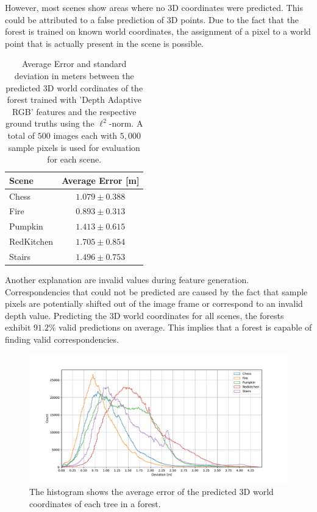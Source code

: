 \documentclass[final]{cvpr}
\begin{document}
However, most scenes show areas where no 3D coordinates
were predicted. This could be attributed to a false prediction of 3D points. Due to the fact that the forest is 
trained on known world coordinates, the assignment of a pixel to a world point that is actually present in the 
scene is possible. 

\begin{table}
	\begin{center}
	\begin{tabular}{|l|c|}
	\hline
	Scene & Average Error [m]\\
	\hline\hline
	Chess 		& 	$1.079 \pm 0.388$ \\
	Fire 		& 	$0.893 \pm 0.313$	\\
	Pumpkin 	& 	$1.413 \pm 0.615$ \\
	RedKitchen 	& 	$1.705 \pm 0.854$ \\
	Stairs 		& 	$1.496 \pm 0.753$ \\
	\hline
	\end{tabular}
	\end{center}
	\caption{Average Error and standard deviation in meters between the predicted 3D world cordinates of the 
	forest trained with 
	'Depth Adaptive RGB' features and the respective ground truths using the $\ell^2$-norm. A total of
	$500$ images each with $5,000$ sample pixels is used for evaluation for each scene.}
	\label{tab:forest-error}
\end{table}

Another explanation are invalid values during feature generation. Correspondencies that could not be predicted are
caused by the fact that sample pixels are potentially shifted out of the image frame or correspond to an invalid depth value. 
Predicting the 3D world coordinates for all scenes, the forests exhibit $91.2\%$ valid predictions on average. 
This implies that a forest is capable of finding valid correspondencies.

\begin{figure}
	\begin{center}
	\includegraphics[width=\textwidth]{images/hist.pdf}
	\end{center}
	\caption{The histogram shows the average error of the predicted 3D world coordinates of each tree in a forest. }
	\label{fig:error-hist}
\end{figure}
\end{document}
